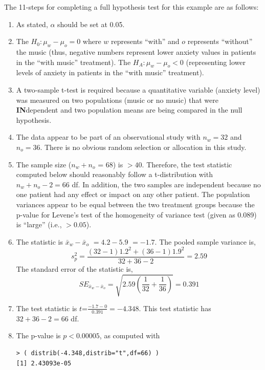 \documentclass[10pt,openany]{book}\usepackage[]{graphicx}\usepackage[]{color}
\makeatletter
\newenvironment{kframe}{%
 \def\at@end@of@kframe{}%
 \ifinner\ifhmode%
  \def\at@end@of@kframe{\end{minipage}}%
  \begin{minipage}{\columnwidth}%
 \fi\fi%
 \def\FrameCommand##1{\hskip\@totalleftmargin \hskip-\fboxsep
 \colorbox{shadecolor}{##1}\hskip-\fboxsep
     \hskip-\linewidth \hskip-\@totalleftmargin \hskip\columnwidth}%
 \MakeFramed {\advance\hsize-\width
   \@totalleftmargin\z@ \linewidth\hsize
   \@setminipage}}%
 {\par\unskip\endMakeFramed%
 \at@end@of@kframe}
\newenvironment{knitrout}{}{} %
\makeatother
\begin{document}
The 11-steps  for completing a full hypothesis test for this example are as follows:
  \begin{enumerate}
    \item As stated, $\alpha$ should be set at 0.05.
    \item The $H_{0}:\mu_{w}-\mu_{o}=0$ where $w$ represents ``with'' and $o$ represents ``without'' the music (thus, negative numbers represent lower anxiety values in patients in the ``with music'' treatment).  The $H_{A}:\mu_{w}-\mu_{o}<0$ (representing lower levels of anxiety in patients in the ``with music'' treatment).
    \item A two-sample t-test is required because a quantitative variable (anxiety level) was measured on two populations (music or no music) that were \textbf{IN}dependent and two population means are being compared in the null hypothesis.
    \item The data appear to be part of an observational study with $n_{w}=32$ and $n_{o}=36$.  There is no obvious random selection or allocation in this study.
    \item The sample size ($n_{w}+n_{o}$ = 68) is $>40$.  Therefore, the test statistic computed below should reasonably follow a t-distribution with $n_{w}+n_{o}-2=66$ df.  In addition, the two samples are independent because no one patient had any effect or impact on any other patient.  The population variances appear to be equal between the two treatment groups because the p-value for Levene's test of the homogeneity of variance test (given as 0.089) is ``large'' (i.e., $>0.05$).
    \item The statistic is $\bar{x}_{w}-\bar{x}_{o}$ $= 4.2-5.9$ $= -1.7$.  The pooled sample variance is,
    \[s_{p}^{2}=\frac{(32-1)1.2^{2}+(36-1)1.9^{2}}{32+36-2} = 2.59 \]
The standard error of the statistic is,
    \[ SE_{\bar{x}_{w}-\bar{x}_{o}}=\sqrt{2.59\left(\frac{1}{32}+\frac{1}{36} \right)} = 0.391  \]
    \item The test statistic is $t$=$\frac{-1.7-0}{0.391} = -4.348$.  This test statistic has $32+36-2=66$ df.
    \item The p-value is $p<0.00005$, as computed with
\begin{knitrout}
\color{fgcolor}\begin{kframe}
\begin{verbatim}
> ( distrib(-4.348,distrib="t",df=66) )
[1] 2.43093e-05
\end{verbatim}
\end{kframe}

\end{knitrout}
\end{enumerate}
\end{document}
